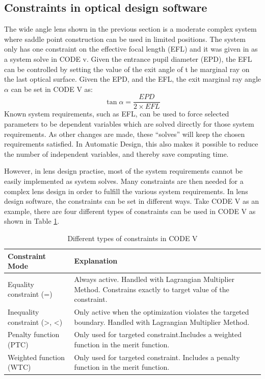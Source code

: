 \subsection{Constraints in optical design software}
The wide angle lens shown in the previous section is a moderate complex system where saddle point construction can be used in limited positions. The system only has one constraint on the effective focal length (EFL) and it was given in as a system solve in CODE v. Given the entrance pupil diameter (EPD), the EFL can be controlled by setting the value of the exit angle of t he marginal ray on the last optical surface. Given the EPD, and the EFL, the exit marginal ray angle $\alpha$ can be set in CODE V as:
\setlength{\belowdisplayshortskip}{5pt}
\setlength{\abovedisplayshortskip}{5pt}
\begin{equation} \label{eq:EFLsolve}
\tan\alpha = \frac{EPD}{2\times EFL}
\end{equation}
\noindent Known system requirements, such as EFL, can be used to force selected parameters to be dependent variables which are solved directly for those system requirements. As other changes are made, these “solves” will keep the chosen requirements satisfied. In Automatic Design, this also makes it possible to reduce the number of independent variables, and thereby save computing time.

However, in lens design practise, most of the system requirements cannot be easily implemented as system solves. Many constraints are then needed for a complex lens design in order to fulfill the various system requirements. In lens design software, the constraints can be set in different ways. Take CODE V as an example, there are four different types of constraints can be used in CODE V as shown in Table \ref{table: codevconstraints}.

\begin{table}[h!]
    \centering
    \captionsetup{justification=centering}
    \caption{Different types of constraints in CODE V\cite{codevmanual}}
    \label{table: codevconstraints}
    \vspace{-1em}
    \begin{tabular}{ p{} | m{} }
    \hline 
    \textbf{Constraint Mode} & \textbf{Explanation}\\
    \hline
    Equality constraint (=) & Always active. Handled with Lagrangian Multiplier Method. Constrains exactly to target value of the constraint.  \\
    \hline
    Inequality constraint (>, <) & Only active when the optimization violates the targeted boundary. Handled with Lagrangian Multiplier Method.\\
    \hline
    Penalty function (PTC) & Only used for targeted constraint.Includes a weighted function in the merit function.\\
    \hline
    Weighted function (WTC) & Only used for targeted constraint. Includes a penalty function in the merit function.\\
    \hline
    \end{tabular}
\end{table}

